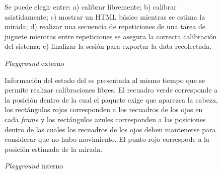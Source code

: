   \begin{figure}
    \centering

    Se puede elegir entre:
    a) calibrar libremente;
    b) calibrar asistidamente;
    c) mostrar un HTML básico mientras se estima la mirada;
    d) realizar una secuencia de repeticiones de una tarea de juguete mientras
    entre repeticiones se asegura la correcta calibración del sistema;
    e) finalizar la sesión para exportar la data recolectada.

    \caption{\textit{Playground} externo}
    \label{fig:external-playground}
  \end{figure}

  \begin{figure}
    \centering

    Información del estado del \eyetracker es presentada al mismo tiempo que se
    permite realizar calibraciones libres.
    El recuadro verde corresponde a la posición dentro de la cual el paquete
    \webgazer exige que aparezca la cabeza, los rectángulos rojos corresponden
    a los recuadros de los ojos en cada \textit{frame} y los rectángulos azules
    corresponden a las posiciones dentro de las cuales los recuadros de los
    ojos deben mantenerse para considerar que no hubo movimiento.
    El punto rojo correspode a la posición estimada de la mirada.

    \caption{\textit{Playground} interno}
    \label{fig:internal-playground}
  \end{figure}

